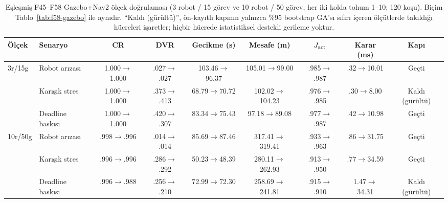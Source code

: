 \begin{table}[t]
\centering
\caption{Eşleşmiş F45--F58 Gazebo+Nav2 ölçek doğrulaması (3 robot / 15
görev ve 10 robot / 50 görev, her iki kolda tohum 1--10; 120 koşu).
Biçim Tablo~\ref{tab:f58-gazebo} ile aynıdır. ``Kaldı (gürültü)'',
ön-kayıtlı kapının yalnızca \%95 bootstrap GA'sı sıfırı içeren
ölçütlerde takıldığı hücreleri işaretler; hiçbir hücrede istatistiksel
destekli gerileme yoktur.}
\label{tab:f58-gazebo-scales}
\small
\setlength{\tabcolsep}{3.4pt}
\begin{tabular}{llccccccc}
\toprule
Ölçek & Senaryo & CR & DVR & Gecikme (s) & Mesafe (m) & $J_{\rm act}$ & Karar (ms) & Kapı \\
\midrule
3r/15g & Robot arızası
  & 1.000$\to$1.000 & .027$\to$.027 & 103.46$\to$96.37
  & 105.01$\to$99.00 & .985$\to$.987 & .32$\to$10.01 & Geçti \\
& Karışık stres
  & 1.000$\to$1.000 & .373$\to$.413 & 68.79$\to$70.72
  & 102.02$\to$104.23 & .976$\to$.985 & .30$\to$8.00 & Kaldı (gürültü) \\
& Deadline baskısı
  & 1.000$\to$1.000 & .420$\to$.307 & 83.34$\to$75.43
  & 97.18$\to$89.08 & .977$\to$.987 & .42$\to$10.98 & Geçti \\
\midrule
10r/50g & Robot arızası
  & .998$\to$.996 & .014$\to$.014 & 85.69$\to$87.46
  & 317.41$\to$319.41 & .933$\to$.963 & .86$\to$31.75 & Geçti \\
& Karışık stres
  & .996$\to$.996 & .286$\to$.292 & 50.23$\to$48.39
  & 280.11$\to$262.93 & .913$\to$.950 & .77$\to$34.59 & Geçti \\
& Deadline baskısı
  & .996$\to$.988 & .256$\to$.210 & 72.99$\to$72.30
  & 258.69$\to$241.81 & .915$\to$.910 & 1.47$\to$34.31 & Kaldı (gürültü) \\
\bottomrule
\end{tabular}
\end{table}
